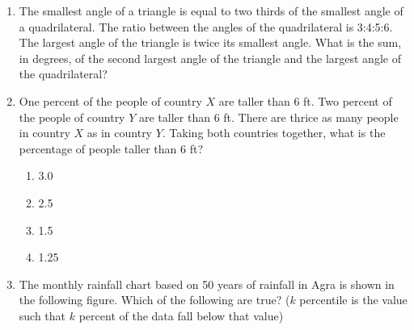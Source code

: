 \documentclass[journal,12pt,onecolumn]{IEEEtran}
\theoremstyle{remark}
\begin{document}
\begin{enumerate}
\item The smallest angle of a triangle is equal to two thirds of the smallest angle of a quadrilateral. The ratio between the angles of the quadrilateral is 3:4:5:6. The largest angle of the triangle is twice its smallest angle. What is the sum, in degrees, of the second largest angle of the triangle and the largest angle of the quadrilateral?

\item One percent of the people of country $X$ are taller than 6 ft. Two percent of the people of country $Y$ are taller than 6 ft. There are thrice as many people in country $X$ as in country $Y$. Taking both countries together, what is the percentage of people taller than 6 ft?
\begin{enumerate}

    \item 3.0
    \item 2.5
    \item 1.5
    \item 1.25
\end{enumerate}

\item The monthly rainfall chart based on 50 years of rainfall in Agra is shown in the following figure. Which of the following are true? ($k$ percentile is the value such that $k$ percent of the data fall below that value)


\pgfplotsset{compat=1.17}
\begin{center}

\end{center}
\end{enumerate}
\end{document}
